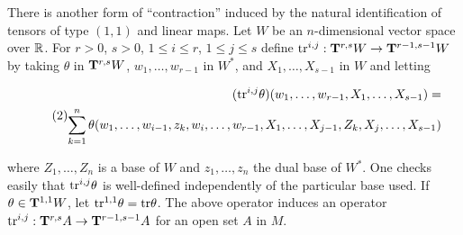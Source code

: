 \documentclass[../main]{subfiles}
\begin{document}
\par There is another form of ``contraction'' induced by the natural identification of tensors of type $(1, 1)$ and linear maps. Let $W$ be an $n$-dimensional vector space over $\bbR$. For $r > 0$, $s > 0$, $1 \le i \le r$, $1 \le j \le s$ define \newline $\tr^{i, j} : \tensorbundle{W}{r}{s} \functionMaps \tensorbundle{W}{r-1}{s-1}$ by taking $\theta$ in $\tensorbundle{W}{r}{s}$, $w_1, \ldots, w_{r - 1}$ in $W^\ast$, and $X_1, \ldots, X_{s - 1}$ in $W$ and letting 

\begin{equation}\tag{2}
\label{eqn:ch07.2}
\begin{split}
(\tr^{i, j} \theta)(w_1, \ldots, w_{r - 1}, X_1, \ldots, X_{s - 1}) = \\ 
\sum_{k = 1}^n \theta(w_1, \ldots, w_{i - 1}, z_k, w_i, \ldots, w_{r - 1}, X_1, \ldots, X_{j - 1}, Z_k, X_j, \ldots, X_{s-1})
\end{split}
\end{equation}

where $Z_1, \ldots, Z_n$ is a base of $W$ and $z_1, \ldots, z_n$ the dual base of $W^\ast$. One checks easily that $\tr^{i, j} \theta$ is well-defined independently of the particular base used. If $\theta \in \tensorbundle{W}{1}{1}$, let $\tr^{1, 1}\theta = \tr \theta$. The above operator induces an operator \newline $\tr^{i, j} : \tensorbundle{A}{r}{s} \functionMaps \tensorbundle{A}{r-1}{s-1}$ for an open set $A$ in $M$. 
\end{document}

